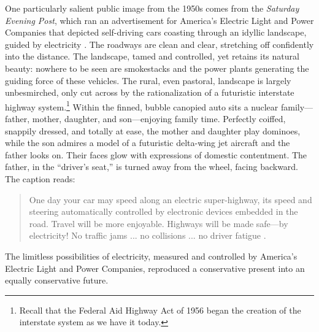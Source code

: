 One particularly salient public image from the 1950s comes from the
\emph{Saturday Evening Post}, which ran an advertisement for America's
Electric Light and Power Companies that depicted self-driving cars
coasting through an idyllic landscape, guided by electricity
\cite{weber}. The roadways 
are clean and clear, stretching off confidently into the distance. The
landscape, tamed and controlled, yet retains its natural beauty:
nowhere to be seen are smokestacks and the power plants generating the
guiding force of these vehicles. The rural, even
pastoral, landscape is largely unbesmirched, only cut across by the
rationalization of a futuristic interstate highway system.\footnote{Recall that
the Federal Aid Highway Act of 1956 began the creation of the
interstate system as we have it today.} Within the finned, bubble
canopied auto sits a nuclear family---father,
mother, daughter, and son---enjoying family time.
Perfectly coiffed, snappily dressed, and totally at ease, the mother
and daughter play dominoes, while the son admires a model of a futuristic
delta-wing jet aircraft and the father looks on. Their faces glow with
expressions of domestic contentment. The father, in the ``driver's
seat,'' is turned away from the wheel, facing backward. The caption reads: 
\begin{quote}
One day your car may speed along an electric super-highway, its speed
and steering automatically controlled by electronic devices embedded
in the road. Travel will be more enjoyable. Highways will be made
safe---by electricity! No traffic jams ... no collisions ... no
driver fatigue \cite{weber}.
\end{quote}
The limitless possibilities of electricity, measured and controlled by
America's Electric Light and Power Companies, reproduced a conservative
present into an equally conservative future. 

